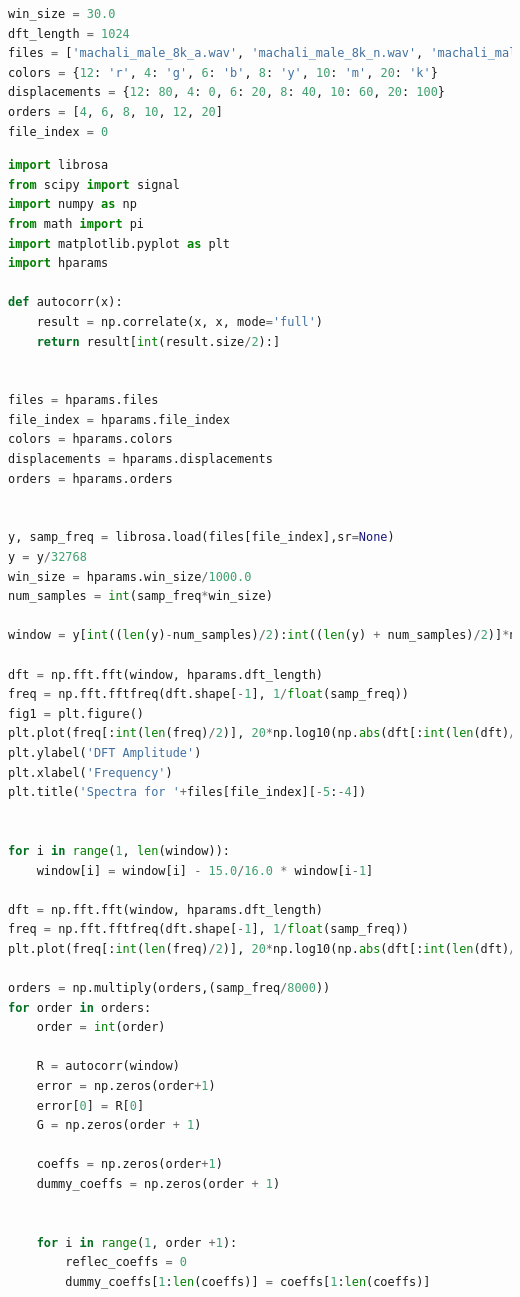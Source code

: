 \documentclass[a4paper]{article}
\begin{document}
\begin{lstlisting}[language=Python, caption=hparams.py]
win_size = 30.0
dft_length = 1024
files = ['machali_male_8k_a.wav', 'machali_male_8k_n.wav', 'machali_male_8k_i.wav', 'machali_male_16k_s.wav']
colors = {12: 'r', 4: 'g', 6: 'b', 8: 'y', 10: 'm', 20: 'k'}
displacements = {12: 80, 4: 0, 6: 20, 8: 40, 10: 60, 20: 100}
orders = [4, 6, 8, 10, 12, 20]
file_index = 0
\end{lstlisting}


\begin{lstlisting}[language=Python, caption=q2a.py]
import librosa
from scipy import signal
import numpy as np
from math import pi
import matplotlib.pyplot as plt
import hparams

def autocorr(x):
    result = np.correlate(x, x, mode='full')
    return result[int(result.size/2):]


files = hparams.files
file_index = hparams.file_index
colors = hparams.colors
displacements = hparams.displacements
orders = hparams.orders


y, samp_freq = librosa.load(files[file_index],sr=None)
y = y/32768
win_size = hparams.win_size/1000.0
num_samples = int(samp_freq*win_size)

window = y[int((len(y)-num_samples)/2):int((len(y) + num_samples)/2)]*np.hamming(num_samples)

dft = np.fft.fft(window, hparams.dft_length)
freq = np.fft.fftfreq(dft.shape[-1], 1/float(samp_freq))
fig1 = plt.figure()
plt.plot(freq[:int(len(freq)/2)], 20*np.log10(np.abs(dft[:int(len(dft)/2)])))
plt.ylabel('DFT Amplitude')
plt.xlabel('Frequency')
plt.title('Spectra for '+files[file_index][-5:-4])


for i in range(1, len(window)):
    window[i] = window[i] - 15.0/16.0 * window[i-1]

dft = np.fft.fft(window, hparams.dft_length)
freq = np.fft.fftfreq(dft.shape[-1], 1/float(samp_freq))
plt.plot(freq[:int(len(freq)/2)], 20*np.log10(np.abs(dft[:int(len(dft)/2)])), 'g')

orders = np.multiply(orders,(samp_freq/8000))
for order in orders:
    order = int(order)

    R = autocorr(window)
    error = np.zeros(order+1)
    error[0] = R[0]
    G = np.zeros(order + 1)

    coeffs = np.zeros(order+1)
    dummy_coeffs = np.zeros(order + 1)
    

    for i in range(1, order +1):
        reflec_coeffs = 0
        dummy_coeffs[1:len(coeffs)] = coeffs[1:len(coeffs)]
        

\end{lstlisting}
\end{document}
